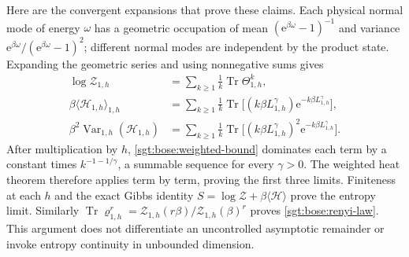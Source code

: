 \documentclass[aps,pra,reprint,superscriptaddress,longbibliography]{revtex4-2}
\newcommand{\Tr}{\operatorname{Tr}}
\newcommand{\ee}{\mathrm e}
\begin{document}
Here are the convergent expansions that prove these claims.  Each
physical normal mode of energy $\omega$ has a geometric occupation of
mean $(\ee^{\beta\omega}-1)^{-1}$ and variance
$\ee^{\beta\omega}/(\ee^{\beta\omega}-1)^2$; different normal modes
are independent by the product state.  Expanding the geometric series
and using nonnegative sums gives
\begin{align}
 \log\mathcal Z_{1,h}
    &=\sum_{k\ge1}\frac1k\Tr\Theta_{1,h}^k,
 \nonumber\\
 \beta\langle\mathcal H_{1,h}\rangle_{1,h}
    &=\sum_{k\ge1}\frac1k
      \Tr\bigl[(k\beta L_{1,h}^{\gamma})
                   \ee^{-k\beta L_{1,h}^{\gamma}}\bigr],
 \nonumber\\
 \beta^2\operatorname{Var}_{1,h}(\mathcal H_{1,h})
    &=\sum_{k\ge1}\frac1k
      \Tr\bigl[(k\beta L_{1,h}^{\gamma})^2
                   \ee^{-k\beta L_{1,h}^{\gamma}}\bigr].
 \label{sgt:bose:series-proof}
\end{align}
After multiplication by $h$, \eqref{sgt:bose:weighted-bound} dominates
each term by a constant times $k^{-1-1/\gamma}$, a summable sequence for
every $\gamma>0$.  The weighted heat theorem therefore applies
term by term, proving the first three limits.  Finiteness at each $h$
and the exact Gibbs identity
$S=\log\mathcal Z+\beta\langle\mathcal H\rangle$ prove the entropy
limit.  Similarly
$\Tr\varrho_{1,h}^r=\mathcal Z_{1,h}(r\beta)/\mathcal Z_{1,h}(\beta)^r$
proves \eqref{sgt:bose:renyi-law}.  This argument does not differentiate
an uncontrolled asymptotic remainder or invoke entropy continuity in
unbounded dimension.
\end{document}
